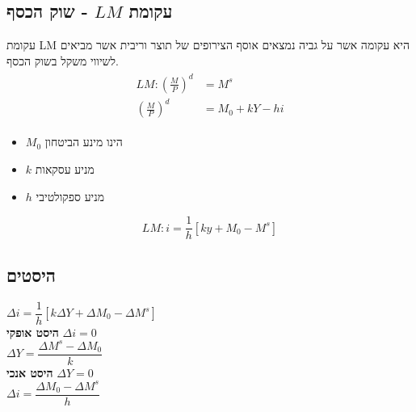 \documentclass[a4paper,11pt]{article}
\newcommand{\D}[1]{\Delta #1}
\begin{document}
\begin{RTL}    
\section{עקומת $LM$ - שוק הכסף}
עקומת LM היא עקומה אשר על גביה נמצאים אוסף הצירופים של תוצר וריבית אשר מביאים לשיווי משקל
בשוק הכסף. 
\begin{align*}
    \begin{split}
       LM : \left(\frac{M}{P}\right) ^ d  & = M ^ s \\ 
       \left(\frac{M}{P}  \right) ^ d    & = M_0 + kY - hi 
    \end{split}
\end{align*}
\begin{itemize}
    \item $M_0$ הינו מינע הביטחון
    \item $k$ מניע עסקאות
    \item $h$ מניע ספקולטיבי
\end{itemize}

\begin{equation*}
    LM : i  = \frac{1}{h} \left[ky + M_0 - M^s \right]
\end{equation*}




\subsection{היסטים}

$\Delta i = \dfrac{1}{h} \left[k\D{Y} + \D{M_0} - \D{M^s}\right]$  \vspace{10pt}
\\
\textbf{היסט אופקי } $\Delta i = 0 $ \vspace{10pt} 
\\
$\D{Y} = \dfrac{\D{M^s} - \D{M_0}}{k}$ \vspace{10pt}
\\ 
\textbf{היסט אנכי } $\D{Y} = 0 $ \vspace{10pt}
\\
$\D{i} = \dfrac{\D{M_0} - \D{M^s} }{h}$


\end{RTL}
\end{document}
